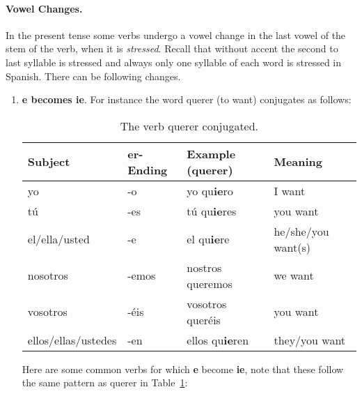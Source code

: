 \documentclass[a4paper,12pt]{article}
\newcommand*{\Verb}[2]{\index{\makebox[0.5\textwidth][l]{#1} #2 \hfill cf.}}
\begin{document}
\paragraph{Vowel Changes. } In the present tense some verbs undergo a vowel change in the last vowel
of the stem of the verb, when it is \emph{stressed}. Recall that without accent the second to last
syllable is stressed and always only one syllable of each word is stressed in Spanish. There can be
following changes.

\begin{enumerate}
\item \textbf{e becomes ie}. For instance the word \textsf{querer} (to want) conjugates as follows:

  \begin{table}[H]
    \centering
    \begin{tabular}{llll}
      Subject             & er-Ending & Example (querer)       & Meaning            \\
      \toprule
      yo                  & -o        & yo qu\textbf{ie}ro     & I want             \\
      tú                  & -es       & tú qu\textbf{ie}res    & you want           \\
      el/ella/usted       & -e        & el qu\textbf{ie}re     & he/she/you want(s) \\
      nosotros            & -emos     & nostros queremos       & we want            \\
      vosotros            & -éis       & vosotros queréis       & you want           \\
      ellos/ellas/ustedes & -en       & ellos qu\textbf{ie}ren & they/you want      \\
      \bottomrule
    \end{tabular}
    \caption{\label{tbl:querer} The verb querer conjugated.\Verb{querer}{to want}}
  \end{table}

  Here are some common verbs for which \textbf{e} become \textbf{ie}, note that these follow the
  same pattern as querer in Table~\ref{tbl:querer}:


\end{enumerate}
\end{document}
